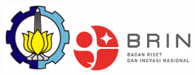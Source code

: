 {    \vspace{10mm}
    
    {\noindent\large\textsf{\color{black}{%
        \textbf{\namaDepartemen}\\[0mm]
        \textbf{\namaFakultas}\\[0mm]
        \textbf{\namaUniversitas}\\[0mm]
        \textbf{\namaKota}\\[0mm]
        \textbf{\the\year}
    }}}


\halamanKosong


\begin{flushleft}
        \includegraphics[width=30mm]{./halaman-depan/00-Logo-ITS.png}
        \hspace{10mm}
        \includegraphics[width=53mm]{./gambar/brin.png}
    \end{flushleft}
    
    \vspace{24mm}
    
    \noindent {\large\textsf{\color{black}{%
    \textbf{\kodeTAInggris} %
    }}}
    
    \vspace{4mm}
    
    \begin{flushleft}
        \noindent {\Large\textsf{\color{black}
        {\MakeUppercase{\textbf{\judulTAInggris}}}}}
    \end{flushleft}
    
}
